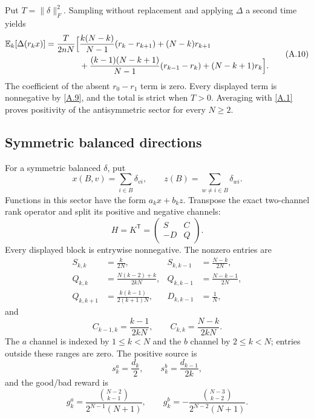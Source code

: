 Put $T=\|\delta\|_F^2$.  Sampling without replacement and applying
$\Delta$ a second time yields
\[
\begin{aligned}
 \mathbb E_k[\Delta(r_kx)]={\frac{T}{2nN}}\Big[&
 {\frac{k(N-k)}{ N-1}}(r_k-r_{k+1})+(N-k)r_{k+1}\\
 &+{\frac{(k-1)(N-k+1)}{ N-1}}(r_{k-1}-r_k)
 +(N-k+1)r_k\Big].
\end{aligned}                                               \tag{A.10}\label{A.10}
\]
The coefficient of the absent $r_0-r_1$ term is zero.  Every displayed term
is nonnegative by \eqref{A.9}, and the total is strict when $T>0$.
Averaging with \eqref{A.1} proves positivity of the antisymmetric sector for
every $N\ge2$.

\subsection{Symmetric balanced directions}

For a symmetric balanced $\delta$, put
\[
 x(B,v)=\sum_{i\in B}\delta_{vi},\qquad
 z(B)=\sum_{w\ne i\in B}\delta_{wi}.                       \tag{A.11}\label{A.11}
\]
Functions in this sector have the form $a_kx+b_kz$.  Transpose the exact
two-channel rank operator and split its positive and negative channels:
\[
 H=K^{\mathsf T}=\begin{pmatrix}S&C\\-D&Q\end{pmatrix}.     \tag{A.12}\label{A.12}
\]
Every displayed block is entrywise nonnegative.  The nonzero entries are
\[
\begin{aligned}
 S_{k,k}&={\frac{k}{2N}},&S_{k,k-1}&={\frac{N-k}{2N}},\\
 Q_{k,k}&={\frac{N(k-2)+k}{2kN}},
 &Q_{k,k-1}&={\frac{N-k-1}{2N}},\\
 Q_{k,k+1}&={\frac{k(k-1)}{2(k+1)N}},
 &D_{k,k-1}&={\frac{1}{ N}},
\end{aligned}                                               \tag{A.13}\label{A.13}
\]
and
\[
 C_{k-1,k}={\frac{k-1}{2kN}},\qquad C_{k,k}={\frac{N-k}{2kN}}.      \tag{A.14}\label{A.14}
\]
The $a$ channel is indexed by $1\le k<N$ and the $b$ channel by
$2\le k<N$; entries outside these ranges are zero.  The positive source is
\[
 s_k^a={\frac{d_k}{2}},\qquad s_k^b={\frac{d_{k-1}}{2k}},            \tag{A.15}\label{A.15}
\]
and the good/bad reward is
\[
 g_k^a={\frac{\binom{N-2}{k-1}}{2^{N-1}(N+1)}},\qquad
 g_k^b=-{\frac{\binom{N-3}{k-2}}{2^{N-2}(N+1)}}.                \tag{A.16}\label{A.16}
\]

